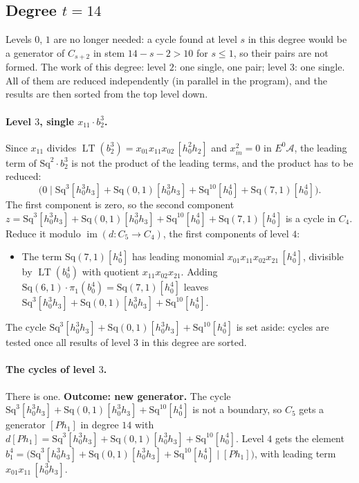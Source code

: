 \documentclass[11pt]{article}
\newcommand{\Sq}{\mathrm{Sq}}
\newcommand{\A}{\mathcal{A}}
\DeclareMathOperator{\LT}{LT}
\begin{document}
\subsection*{Degree $t = 14$}
\noindent Levels $0$, $1$ are no longer needed: a cycle found at level $s$ in this degree would be a generator of $C_{s+2}$ in stem $14-s-2 > 10$ for $s \le 1$, so their pairs are not formed.
\noindent The work of this degree: level $2$: one single, one pair; level $3$: one single. All of them are reduced independently (in parallel in the program), and the results are then sorted from the top level down.
\medskip
\paragraph{Level $3$, single $x_{11}\cdot b^{3}_{2}$.} Since $x_{11}$ divides $\LT(b^{3}_{2}) = x_{01}x_{11}x_{02}\,[h_0^2h_2]$ and $x_{in}^2 = 0$ in $E^0\A$, the leading term of $\Sq^{2}\cdot b^{3}_{2}$ is not the product of the leading terms, and the product has to be reduced:
\[\bigl(0 \;\big|\; \Sq^{3}[h_0^3h_3] + \Sq(0,1)[h_0^3h_3] + \Sq^{10}[h_0^4] + \Sq(7,1)[h_0^4]\bigr).\]
The first component is zero, so the second component $z = \Sq^{3}[h_0^3h_3] + \Sq(0,1)[h_0^3h_3] + \Sq^{10}[h_0^4] + \Sq(7,1)[h_0^4]$ is a cycle in $C_{4}$.
Reduce it modulo $\operatorname{im}(d\colon C_{5}\to C_{4})$, the first components of level $4$:
\begin{itemize}
\item The term $\Sq(7,1)[h_0^4]$ has leading monomial $x_{01}x_{11}x_{02}x_{21}\,[h_0^4]$, divisible by $\LT(b^{4}_{0})$ with quotient $x_{11}x_{02}x_{21}$. Adding $\Sq(6,1)\cdot \pi_1(b^{4}_{0}) = \Sq(7,1)[h_0^4]$ leaves $\Sq^{3}[h_0^3h_3] + \Sq(0,1)[h_0^3h_3] + \Sq^{10}[h_0^4]$.
\end{itemize}
The cycle $\Sq^{3}[h_0^3h_3] + \Sq(0,1)[h_0^3h_3] + \Sq^{10}[h_0^4]$ is set aside: cycles are tested once all results of level $3$ in this degree are sorted.
\medskip
\paragraph{The cycles of level $3$.} There is one.
\textbf{Outcome: new generator.} The cycle $\Sq^{3}[h_0^3h_3] + \Sq(0,1)[h_0^3h_3] + \Sq^{10}[h_0^4]$ is not a boundary, so $C_{5}$ gets a generator $[Ph_1]$ in degree $14$ with $d[Ph_1] = \Sq^{3}[h_0^3h_3] + \Sq(0,1)[h_0^3h_3] + \Sq^{10}[h_0^4]$.
Level $4$ gets the element $b^{4}_{1} = \bigl(\Sq^{3}[h_0^3h_3] + \Sq(0,1)[h_0^3h_3] + \Sq^{10}[h_0^4] \;\big|\; [Ph_1]\bigr)$, with leading term $x_{01}x_{11}\,[h_0^3h_3]$.
\medskip
\end{document}
